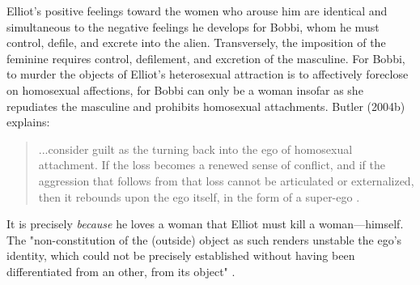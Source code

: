 \documentclass[letterpaper,12pt]{turabian-researchpaper}
\begin{document}
Elliot's positive feelings toward the women who arouse him are identical and simultaneous to the negative feelings he develops for Bobbi, whom he must control, defile, and excrete into the alien. Transversely, the imposition of the feminine requires control, defilement, and excretion of the masculine. For Bobbi, to murder the objects of Elliot's heterosexual attraction is to affectively foreclose on homosexual affections, for Bobbi can only be a woman insofar as she repudiates the masculine and prohibits homosexual attachments. Butler (2004b) explains:
\begin{quotation}
\noindent ...consider guilt as the turning back into the ego of homosexual attachment. If the loss becomes a renewed sense of conflict, and if the aggression that follows from that loss cannot be articulated or externalized, then it rebounds upon the ego itself, in the form of a super-ego \autocite[251]{butler_melancholy_2004}.
\end{quotation}
It is precisely \textit{because} he loves a woman that Elliot must kill a woman---himself. The "non-constitution of the (outside) object as such renders unstable the ego's identity, which could not be precisely established without having been differentiated from an other, from its object" \autocite[62]{kristeva_powers_1982}.
\end{document}
